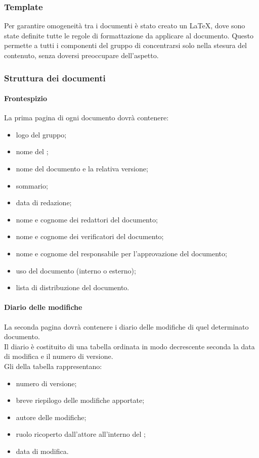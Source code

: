 \subsubsection{Template}
Per garantire omogeneità tra i documenti è stato creato un  \LaTeX, dove sono state definite tutte le regole di formattazione da applicare al documento. Questo permette a tutti i componenti del gruppo di concentrarsi solo nella stesura del contenuto, senza doversi preoccupare dell'aspetto. 
\subsubsection{Struttura dei documenti}
 \paragraph{Frontespizio} 
La prima pagina di ogni documento dovrà contenere:
\begin{itemize}
	\item logo del gruppo;
	\item nome del ;
	\item nome del documento e la relativa versione;
	\item sommario;
	\item data di redazione;
	\item nome e cognome dei redattori del documento;
	\item nome e cognome dei verificatori del documento;
	\item nome e cognome del responsabile per l'approvazione del documento;
	\item uso del documento (interno o esterno);
	\item lista di distribuzione del documento.
\end{itemize}
 \paragraph{Diario delle modifiche}
 La seconda pagina dovrà contenere i diario delle modifiche di quel determinato documento.\\
 Il diario è costituito di una tabella ordinata in modo decrescente seconda la data di modifica e il numero di versione.\\
 Gli  della tabella rappresentano:
 \begin{itemize}
 	\item numero di versione;
 	\item breve riepilogo delle modifiche apportate;
 	\item autore delle modifiche;
 	\item ruolo ricoperto dall'attore all'interno del ;
 	\item data di modifica.
 \end{itemize}
